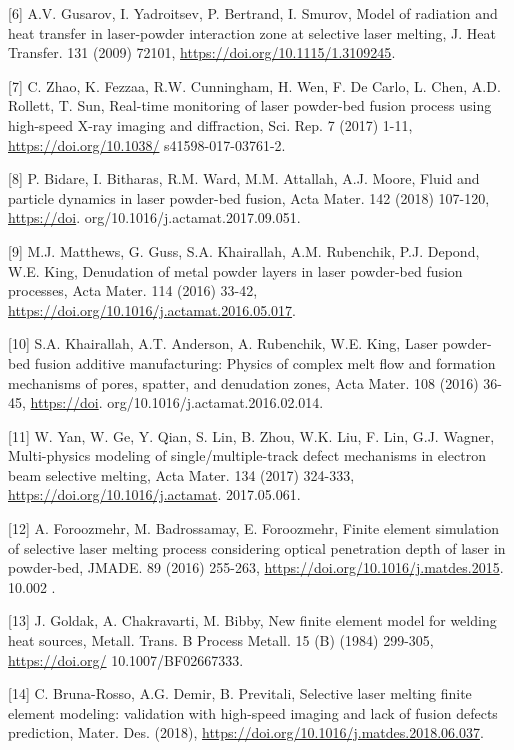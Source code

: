 \documentclass[10pt]{article}
\begin{document}
[6] A.V. Gusarov, I. Yadroitsev, P. Bertrand, I. Smurov, Model of radiation and heat transfer in laser-powder interaction zone at selective laser melting, J. Heat Transfer. 131 (2009) 72101, \href{https://doi.org/10.1115/1.3109245}{https://doi.org/10.1115/1.3109245}.

[7] C. Zhao, K. Fezzaa, R.W. Cunningham, H. Wen, F. De Carlo, L. Chen, A.D. Rollett, T. Sun, Real-time monitoring of laser powder-bed fusion process using high-speed X-ray imaging and diffraction, Sci. Rep. 7 (2017) 1-11, \href{https://doi.org/10.1038/}{https://doi.org/10.1038/} s41598-017-03761-2.

[8] P. Bidare, I. Bitharas, R.M. Ward, M.M. Attallah, A.J. Moore, Fluid and particle dynamics in laser powder-bed fusion, Acta Mater. 142 (2018) 107-120, \href{https://doi}{https://doi}. org/10.1016/j.actamat.2017.09.051.

[9] M.J. Matthews, G. Guss, S.A. Khairallah, A.M. Rubenchik, P.J. Depond, W.E. King, Denudation of metal powder layers in laser powder-bed fusion processes, Acta Mater. 114 (2016) 33-42, \href{https://doi.org/10.1016/j.actamat.2016.05.017}{https://doi.org/10.1016/j.actamat.2016.05.017}.

[10] S.A. Khairallah, A.T. Anderson, A. Rubenchik, W.E. King, Laser powder-bed fusion additive manufacturing: Physics of complex melt flow and formation mechanisms of pores, spatter, and denudation zones, Acta Mater. 108 (2016) 36-45, \href{https://doi}{https://doi}. org/10.1016/j.actamat.2016.02.014.

[11] W. Yan, W. Ge, Y. Qian, S. Lin, B. Zhou, W.K. Liu, F. Lin, G.J. Wagner, Multi-physics modeling of single/multiple-track defect mechanisms in electron beam selective melting, Acta Mater. 134 (2017) 324-333, \href{https://doi.org/10.1016/j.actamat}{https://doi.org/10.1016/j.actamat}. 2017.05.061.

[12] A. Foroozmehr, M. Badrossamay, E. Foroozmehr, Finite element simulation of selective laser melting process considering optical penetration depth of laser in powder-bed, JMADE. 89 (2016) 255-263, \href{https://doi.org/10.1016/j.matdes.2015}{https://doi.org/10.1016/j.matdes.2015}. 10.002 .

[13] J. Goldak, A. Chakravarti, M. Bibby, New finite element model for welding heat sources, Metall. Trans. B Process Metall. 15 (B) (1984) 299-305, \href{https://doi.org/}{https://doi.org/} 10.1007/BF02667333.

[14] C. Bruna-Rosso, A.G. Demir, B. Previtali, Selective laser melting finite element modeling: validation with high-speed imaging and lack of fusion defects prediction, Mater. Des. (2018), \href{https://doi.org/10.1016/j.matdes.2018.06.037}{https://doi.org/10.1016/j.matdes.2018.06.037}.
\end{document}

